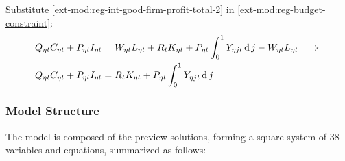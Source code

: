 \documentclass[../thesis.tex]{subfiles}
\begin{document}
Substitute \ref{ext-mod:reg-int-good-firm-profit-total-2} in \ref{ext-mod:reg-budget-constraint}:
\begin{align}
	& Q_{\eta t} C_{\eta t} + P_{\eta t} I_{\eta t} = W_{\eta t} L_{\eta t} + R_{t} K_{\eta t} + P_{\eta t} \int_{0}^{1} Y_{\eta jt} \operatorname{d} j - W_{\eta t} L_{\eta t} \implies \nonumber \\
	& Q_{\eta t} C_{\eta t} + P_{\eta t} I_{\eta t} = R_{t} K_{\eta t} + P_{\eta t} \int_{0}^{1} Y_{\eta jt} \operatorname{d} j \label{ext-mod:reg-budget-constraint-3}
\end{align}
 

\begin{comment}

\begin{align}
	& \text{where:} \quad Y_{\eta t} = C_{\eta 1 t} + C_{\eta 2 t} + I_{\eta t} %
	L_{\eta t} &= \int_{0}^{1} L_{\eta jt} \dif j %
\end{align}

\end{comment}

\newpage


\subsubsection{Model Structure}

The model is composed of the preview solutions, forming a square system of 38 variables and equations, summarized as follows:
\end{document}
